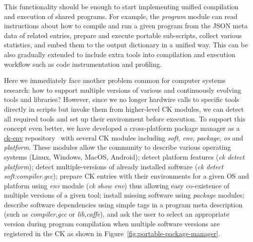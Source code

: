 This functionality should be enough to start implementing unified compilation and execution
of shared programs.
%
For example, the \textit{program} module can read instructions about how to compile and run
a given program from the JSON meta data of related entries, prepare and execute portable sub-scripts,
collect various statistics, and embed them to the output dictionary in a unified way.
%
This can be also gradually extended to include extra tools into compilation and execution workflow
such as code instrumentation and profiling.

Here we immediately face another problem common for computer systems research:
how to support multiple versions of various and continuously evolving tools and libraries?
%
However, since we no longer hardwire calls to specific tools directly in scripts
but invoke them from higher-level CK modules, we can detect all required tools
and set up their environment before execution.
%
To support this concept even better, we have developed a cross-platform package manager
as a \href{https://github.com/ctuning/ck-env}{ck-env} repository~\cite{ck-env} with several CK modules
including \textit{soft}, \textit{env}, \textit{package}, \textit{os} and \textit{platform}.
%
These modules allow the community to describe various operating systems (Linux, Windows, MacOS, Android);
detect platform features (\textit{ck detect platform}); detect multiple-versions of
already installed software (\textit{ck detect soft:compiler.gcc});
prepare CK entries with their environments for a given OS and platform
using \textit{env} module (\textit{ck show env}) thus allowing easy co-existence of multiple versions of a given tool;
install missing software using \textit{package} modules;
describe software dependencies using simple tags
in a program meta description (such as \textit{compiler,gcc} or \textit{lib,caffe}),
and ask the user to select an appropriate version during program compilation when multiple software
versions are registered in the CK as shown in Figure~\ref{fig:portable-package-manager}.

